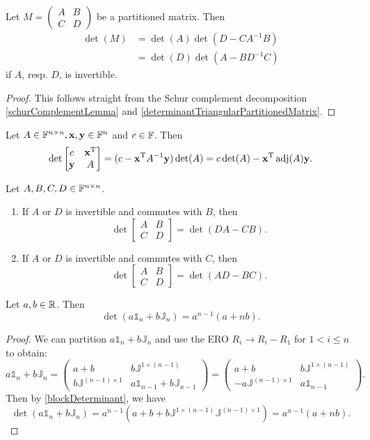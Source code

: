 \begin{lemma} \label{blockDeterminant}
Let $M = \begin{pmatrix}
A & B \\ C & D
\end{pmatrix}$ be a partitioned matrix. Then
\begin{align*}
\det(M) &= \det(A)\det(D-CA^{-1}B) \\
&= \det(D)\det(A-BD^{-1}C)
\end{align*}
if $A$, resp. $D$, is invertible.
\end{lemma}
\begin{proof}
This follows straight from the Schur complement decomposition \ref{schurComplementLemma} and \ref{determinantTriangularPartitionedMatrix}.
\end{proof}
\begin{corollary}
Let $A\in\mathbb{F}^{n\times n}, \boldsymbol{\mathrm{x}},\boldsymbol{\mathrm{y}}\in\mathbb{F}^n$ and $c\in \mathbb{F}$. Then
\[ \det \begin{bmatrix}
c & \boldsymbol{\mathrm{x}}^{\mathrm{T}} \\ \boldsymbol{\mathrm{y}} & A
\end{bmatrix} = (c-\boldsymbol{\mathrm{x}}^{\mathrm{T}} A^{-1}\boldsymbol{\mathrm{y}})\det(A) = c\det(A) - \boldsymbol{\mathrm{x}}^{\mathrm{T}} \operatorname{adj}(A) \boldsymbol{\mathrm{y}}. \]
\end{corollary}
\begin{corollary}
Let $A,B,C,D\in\mathbb{F}^{n\times n}$.
\begin{enumerate}
\item If $A$ or $D$ is invertible and commutes with $B$, then
\[ \det\begin{bmatrix}
A & B \\ C & D
\end{bmatrix} = \det(DA-CB). \]
\item If $A$ or $D$ is invertible and commutes with $C$, then
\[ \det\begin{bmatrix}
A & B \\ C & D
\end{bmatrix} = \det(AD-BC). \]
\end{enumerate}
\end{corollary}

\begin{lemma}
Let $a,b\in\mathbb{R}$. Then
\[ \det(a\mathbb{1}_n+b\mathbb{J}_n) = a^{n-1}(a+nb). \]
\end{lemma}
\begin{proof}
We can partition $a\mathbb{1}_n+b\mathbb{J}_n$ and use the ERO $R_i\to R_i-R_1$ for $1<i\leq n$ to obtain:
\[ a\mathbb{1}_n+b\mathbb{J}_n = \begin{pmatrix}
a+b & b\mathbb{J}^{1\times (n-1)} \\
b\mathbb{J}^{(n-1)\times 1} & a\mathbb{1}_{n-1}+b\mathbb{J}_{n-1}
\end{pmatrix} = \begin{pmatrix}
a+b & b\mathbb{J}^{1\times (n-1)} \\
-a\mathbb{J}^{(n-1)\times 1} & a\mathbb{1}_{n-1}
\end{pmatrix}. \]
Then by \ref{blockDeterminant}, we have
\[ \det(a\mathbb{1}_n+b\mathbb{J}_n) = a^{n-1}(a+b +b\mathbb{J}^{1\times (n-1)}\mathbb{J}^{(n-1)\times 1}) = a^{n-1}(a+nb). \]
\end{proof}

